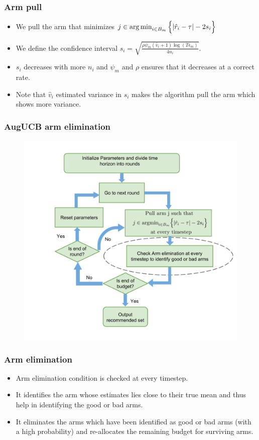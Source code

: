 \begin{frame}
\frametitle{Arm pull}
\begin{itemize}
\item<1-> We pull the arm that minimizes $j\in\operatorname*{arg\,min}_{i\in B_{m}}\Big\lbrace |\hat{r}_{i} - \tau | - 2s_{i}\Big\rbrace$
\item<2-> We define the confidence interval $s_i  = \sqrt{\frac{\rho\psi_m (\hat{v}_{i}+1) \log ( T \epsilon_{m})}{4 n_{i}}}$.
\item<3-> $s_i$ decreases with more $n_i$ and $\psi_m$ and $\rho$ ensures that it decreases at a correct rate.
\item<4-> Note that $\hat{v}_i$ estimated variance in $s_i$ makes the algorithm pull the arm which shows more variance. 
\end{itemize}
\end{frame}

\begin{frame}
\frametitle{AugUCB arm elimination}
\begin{figure}
\includegraphics[scale=0.24]{img/AugUCB_flow_elim.png}
\end{figure}
\end{frame}


\begin{frame}
\frametitle{Arm elimination}
\begin{itemize}
\item<1-> Arm elimination condition is checked at every timestep.
\item<2-> It identifies the arm whose estimates lies close to their true mean and thus help in identifying the good or bad arms. 
\item<3-> It eliminates the arms which have been identified as good or bad arms (with a high probability) and re-allocates the remaining budget for surviving arms. 
\end{itemize}
\end{frame}


